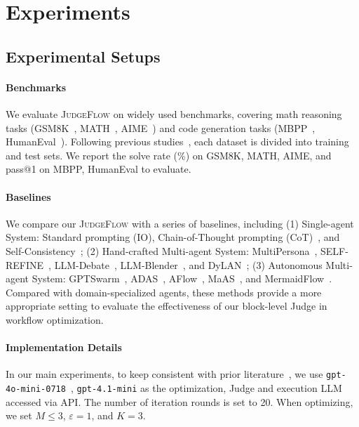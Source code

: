 \documentclass{article}
\theoremstyle{plain}
\theoremstyle{definition}
\theoremstyle{remark}
\def \our{\textsc{JudgeFlow}}
\begin{document}
\section{Experiments}
\subsection{Experimental Setups}

\paragraph{Benchmarks} We evaluate \our{} on widely used benchmarks, covering math reasoning tasks (GSM8K~\citep{cobbe_training_2021}, MATH~\citep{hendrycks_measuring_2021}, AIME~\citep{ye2025aimepreview}) and code generation tasks (MBPP~\citep{austin_program_2021}, HumanEval~\citep{chen_evaluating_2021}). Following previous studies~\citep{zhang_aflow_2025, zhang_multi-agent_2025}, each dataset is divided into training and test sets. We report the solve rate (\%) on GSM8K, MATH, AIME, and pass@1 on MBPP, HumanEval to evaluate.  

\paragraph{Baselines} We compare our \our{} with a series of baselines, including (1) Single-agent System: Standard prompting (IO), Chain-of-Thought prompting (CoT)~\citep{wei2023chainofthoughtpromptingelicitsreasoning}, and Self-Consistency~\citep{wang2023selfconsistencyimproveschainthought}; (2) Hand-crafted Multi-agent System: MultiPersona~\citep{wang2024unleashingemergentcognitivesynergy}, SELF-REFINE~\citep{madaan_self-refine_nodate}, LLM-Debate~\citep{du_improving_2023}, LLM-Blender~\citep{jiang2023llmblenderensemblinglargelanguage}, and DyLAN~\citep{liu_dynamic_2024}; (3) Autonomous Multi-agent System: GPTSwarm~\citep{zhuge_language_2024}, ADAS~\citep{hu_automated_2025}, AFlow~\citep{zhang_aflow_2025}, MaAS~\citep{zhang_multi-agent_2025}, and MermaidFlow~\citep{zheng_mermaidflow_2025}. Compared with domain-specialized agents, these methods provide a more appropriate setting to evaluate the effectiveness of our block-level Judge in workflow optimization.

\paragraph{Implementation Details} In our main experiments, to keep consistent with prior literature~\citep{zheng_mermaidflow_2025}, we use \texttt{gpt-4o-mini-0718}~\citep{openai_gpt4o_mini_2024}, \texttt{gpt-4.1-mini} \citep{openai_gpt41_mini_2025} as the optimization, Judge and execution LLM accessed via API. The number of iteration rounds is set to 20. When optimizing, we set $M \leq 3$, $\varepsilon=1$, and $K=3$. 
\end{document}
